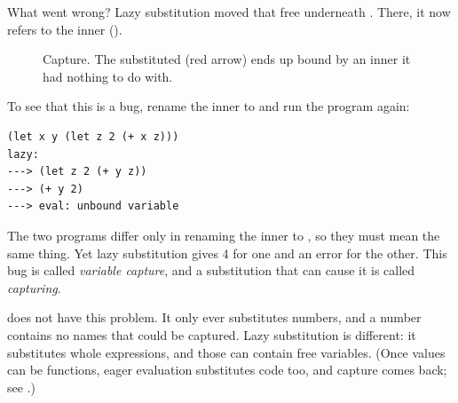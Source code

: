 What went wrong? Lazy substitution moved that free  underneath . There, it now refers to the inner  ().

\begin{figure}[htbp]
\centering
{}
\caption{Capture. The substituted  (red arrow) ends up bound by an inner  it had nothing to do with.}
\label{fig:capture}
\end{figure}

To see that this is a bug, rename the inner  to  and run the program again:
\begin{lstlisting}[style=repl]
(let x y (let z 2 (+ x z)))
lazy:
---> (let z 2 (+ y z))
---> (+ y 2)
---> eval: unbound variable
\end{lstlisting}

\begin{keypoint}
The two programs differ only in renaming the inner  to , so they must mean the same thing. Yet lazy substitution gives 4 for one and an error for the other. This bug is called \emph{variable capture}, and a substitution that can cause it is called \emph{capturing}.
\end{keypoint}

 does not have this problem. It only ever substitutes numbers, and a number contains no names that could be captured. Lazy substitution is different: it substitutes whole expressions, and those can contain free variables. (Once values can be functions, eager evaluation substitutes code too, and capture comes back; see .)
